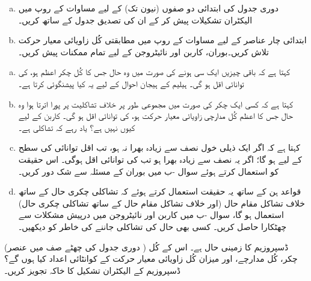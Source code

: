 \begin{enumerate}[a.]
\item
 دوری جدول کی ابتدائی دو صفوں (نیون تک) کے لیے مساوات  کے روپ میں الیکٹران تشکیلات پیش کر کے ان کی تصدیق جدول  کے ساتھ کریں۔ 
 \item
 ابتدائی چار عناصر کے لیے مساوات  کے روپ میں مطابقتی کُل زاویائی معیار حرکت تلاش کریں۔بوران، کاربن اور نائیٹروجن کے لیے تمام ممکنات پیش کریں۔
 \end{enumerate}
\begin{enumerate}[a.]
\item
{} کہتا ہے کہ باقی چیزیں ایک سی  ہونے کی صورت میں وہ حال جس کا کُل چکر  اعظم ہو، کی توانائی اقل ہو گی۔ ہیلیم کے ہیجان احوال کے لیے یہ کیا پیشنگوئی کرتا ہے۔
 \item
{} کہتا ہے کہ کسی ایک چکر کی صورت میں مجموعی طور پر خلاف تشاکلیت پر پورا اترتا ہوا وہ حال جس کا اعظم کُل مدارچی زاویائی معیار حرکت  ہو، کی توانائی اقل ہو گی۔ کاربن کے لیے  کیوں نہیں ہے؟ یاد رہے کہ   تشاکلی ہے۔
\item
{} کہتا ہے کہ اگر ایک ذیلی خول  نصف سے زیادہ بھرا نہ ہو، تب اقل توانائی کی سطح کے لیے  ہو گا؛ اگر یہ نصف سے زیادہ بھرا ہو تب  کی توانائی اقل ہوگی۔ اس حقیقت کو استعمال کرتے ہوئے سوال -ب میں بوران کے مسئلہ سے شک دور کریں۔
\item
 قواعد ہن کے ساتھ یہ حقیقت استعمال کرتے ہوئے کہ تشاکلی چکری حال کے ساتھ خلاف تشاکل مقام حال (اور خلاف تشاکل مقام حال کے ساتھ تشاکلی چکری حال) استعمال ہو گا، سوال -ب میں کاربن اور نائیٹروجن میں درپیش مشکلات سے چھٹکارا حاصل کریں۔ کسی بھی حال کی تشاکلی جاننے کی خاطر  کو دیکھیں۔
\end{enumerate}
 (دوری جدول کی چھٹے صف میں عنصر ) ڈسپروزیم کا زمینی حال  ہے۔ اس کے کُل چکر، کُل مدارچے، اور میزان کُل زاویائی معیار حرکت کے کوانٹائی اعداد کیا ہوں گے؟ ڈسپروزیم کے الیکٹران تشکیل کا خاکہ تجویز کریں۔
 
